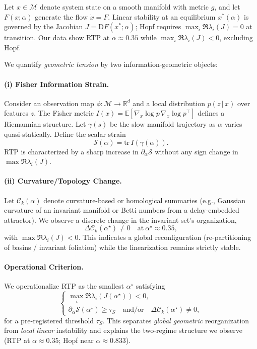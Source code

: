 \documentclass[11pt,twocolumn]{article}
\begin{document}
Let $x\in\mathcal{M}$ denote system state on a smooth manifold with metric $g$, and let $F(x;\alpha)$ generate the flow $\dot{x}=F$. Linear stability at an equilibrium $x^\ast(\alpha)$ is governed by the Jacobian $J=\mathrm{D}F(x^\ast;\alpha)$; Hopf requires $\max_i \Re\lambda_i(J)=0$ at transition. Our data show RTP at $\alpha\approx0.35$ while $\max_i \Re\lambda_i(J)<0$, excluding Hopf.

We quantify \emph{geometric tension} by two information-geometric objects:

\paragraph{(i) Fisher Information Strain.}
Consider an observation map $\phi:\mathcal{M}\to\mathbb{R}^d$ and a local distribution $p(z\,|\,x)$ over features $z$. The Fisher metric $I(x)=\mathbb{E}[\nabla_x \log p \,\nabla_x \log p^\top]$ defines a Riemannian structure. Let $\gamma(s)$ be the slow manifold trajectory as $\alpha$ varies quasi-statically. Define the scalar strain
\[
\mathcal{S}(\alpha)=\mathrm{tr}\,I\!\left(\gamma(\alpha)\right).
\]
RTP is characterized by a sharp increase in $\partial_\alpha \mathcal{S}$ without any sign change in $\max \Re\lambda_i(J)$.

\paragraph{(ii) Curvature/Topology Change.}
Let $\mathcal{C}_k(\alpha)$ denote curvature-based or homological summaries (e.g., Gaussian curvature of an invariant manifold or Betti numbers from a delay-embedded attractor). We observe a discrete change in the invariant set's organization,
\[
\Delta \mathcal{C}_k(\alpha^\star)\neq 0\quad \text{at}\ \alpha^\star\approx 0.35,
\]
with $\max \Re\lambda_i(J)<0$. This indicates a global reconfiguration (re-partitioning of basins / invariant foliation) while the linearization remains strictly stable.

\paragraph{Operational Criterion.}
We operationalize RTP as the smallest $\alpha^\star$ satisfying
\[
\begin{cases}
\max\limits_i \Re\lambda_i(J(\alpha^\star)) < 0,\\[2pt]
\partial_\alpha \mathcal{S}(\alpha^\star) \ge \tau_S\quad \text{and/or}\quad \Delta \mathcal{C}_k(\alpha^\star)\neq 0,
\end{cases}
\]
for a pre-registered threshold $\tau_S$. This separates \emph{global geometric} reorganization from \emph{local linear} instability and explains the two-regime structure we observe (RTP at $\alpha\!\approx\!0.35$; Hopf near $\alpha\!\approx\!0.833$).
\end{document}
